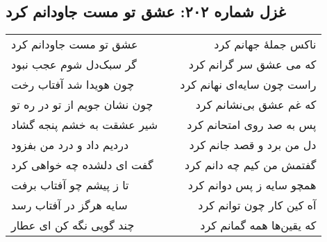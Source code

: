 \begin{center}
\section*{غزل شماره ۲۰۲: عشق تو مست جاودانم کرد}
\label{sec:202}
\begin{longtable}{l p{0.5cm} r}
عشق تو مست جاودانم کرد
&&
ناکس جملهٔ جهانم کرد
\\
گر سبک‌دل شوم عجب نبود
&&
که می عشق سر گرانم کرد
\\
چون هویدا شد آفتاب رخت
&&
راست چون سایه‌ای نهانم کرد
\\
چون نشان جویم از تو در ره تو
&&
که غم عشق بی‌نشانم کرد
\\
شیر عشقت به خشم پنجه گشاد
&&
پس به صد روی امتحانم کرد
\\
دردیم داد و درد من بفزود
&&
دل من برد و قصد جانم کرد
\\
گفت ای دلشده چه خواهی کرد
&&
گفتمش من کیم چه دانم کرد
\\
تا ز پیشم چو آفتاب برفت
&&
همچو سایه ز پس دوانم کرد
\\
سایه هرگز در آفتاب رسد
&&
آه کین کار چون توانم کرد
\\
چند گویی نگه کن ای عطار
&&
که یقین‌ها همه گمانم کرد
\\
\end{longtable}
\end{center}

